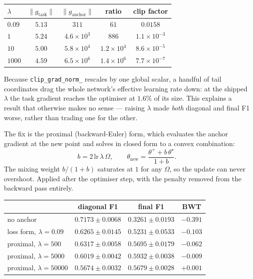 \documentclass{article}
\begin{document}
\begin{center}
\begin{tabular}{lcccc}
\toprule
$\lambda$ & $\lVert g_{\text{task}}\rVert$ & $\lVert g_{\text{anchor}}\rVert$ & ratio & clip factor \\
\midrule
$0.09$ & $5.13$ & $311$              & $61$              & $0.0158$ \\
$1$    & $5.24$ & $4.6\times10^{3}$  & $886$             & $1.1\times10^{-3}$ \\
$10$   & $5.00$ & $5.8\times10^{4}$  & $1.2\times10^{4}$ & $8.6\times10^{-5}$ \\
$1000$ & $4.59$ & $6.5\times10^{6}$  & $1.4\times10^{6}$ & $7.7\times10^{-7}$ \\
\bottomrule
\end{tabular}
\end{center}

Because \texttt{clip\_grad\_norm\_} rescales by one global scalar, a handful of
tail coordinates drag the whole network's effective learning rate down: at the
shipped $\lambda$ the task gradient reaches the optimiser at $1.6\%$ of its size.
This explains a result that otherwise makes no sense --- raising $\lambda$ made
\emph{both} diagonal and final F1 worse, rather than trading one for the other.

The fix is the proximal (backward-Euler) form, which evaluates the anchor
gradient at the new point and solves in closed form to a convex combination:
\begin{equation}
b = 2\,\mathrm{lr}\,\lambda\,\Omega,
\qquad
\theta_{\text{new}} = \frac{\theta^{+} + b\,\theta^\star}{1+b}.
\label{eq:prox}
\end{equation}
The mixing weight $b/(1+b)$ saturates at $1$ for any $\Omega$, so the update can
never overshoot. Applied after the optimiser step, with the penalty removed from
the backward pass entirely.

\begin{center}
\begin{tabular}{lccc}
\toprule
 & diagonal F1 & final F1 & BWT \\
\midrule
no anchor                  & $0.7173 \pm 0.0068$ & $0.3261 \pm 0.0193$ & $-0.391$ \\
loss form, $\lambda=0.09$  & $0.6265 \pm 0.0145$ & $0.5231 \pm 0.0533$ & $-0.103$ \\
proximal, $\lambda=500$    & $0.6317 \pm 0.0058$ & $0.5695 \pm 0.0179$ & $-0.062$ \\
proximal, $\lambda=5000$   & $0.6019 \pm 0.0042$ & $\mathbf{0.5932 \pm 0.0038}$ & $-0.009$ \\
proximal, $\lambda=50000$  & $0.5674 \pm 0.0032$ & $0.5679 \pm 0.0028$ & $+0.001$ \\
\bottomrule
\end{tabular}
\end{center}
\end{document}
